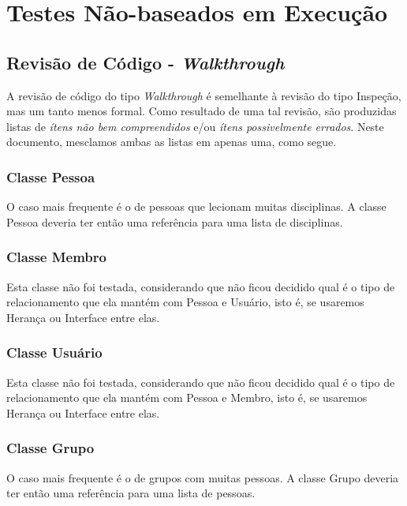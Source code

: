 \documentclass[11pt, a4paper]{book}
\begin{document}
\section{Testes Não-baseados em Execução}
\label{sec:naoexec}

\subsection{Revisão de Código - \emph{Walkthrough}}

A revisão de código do tipo \emph{Walkthrough} é semelhante à revisão do tipo Inspeção, mas um tanto menos formal.  Como resultado de uma tal revisão, são produzidas listas de \emph{ítens não bem compreendidos} e/ou \emph{ítens possivelmente errados}\citep{schach2007}.
Neste documento, mesclamos ambas as listas em apenas uma, como segue.


\subsubsection{Classe Pessoa}

O caso mais frequente é o de pessoas que lecionam muitas disciplinas. A classe Pessoa deveria ter então uma referência para uma lista de disciplinas.

\subsubsection{Classe Membro}

Esta classe não foi testada, considerando que não ficou decidido qual é o tipo de relacionamento que ela mantém com Pessoa e Usuário, isto é, se usaremos Herança ou Interface entre elas.

\subsubsection{Classe Usuário}

Esta classe não foi testada, considerando que não ficou decidido qual é o tipo de relacionamento que ela mantém com Pessoa e Membro, isto é, se usaremos Herança ou Interface entre elas.

\subsubsection{Classe Grupo}

O caso mais frequente é o de grupos com muitas pessoas. A classe Grupo deveria ter então uma referência para uma lista de pessoas.
\end{document}
